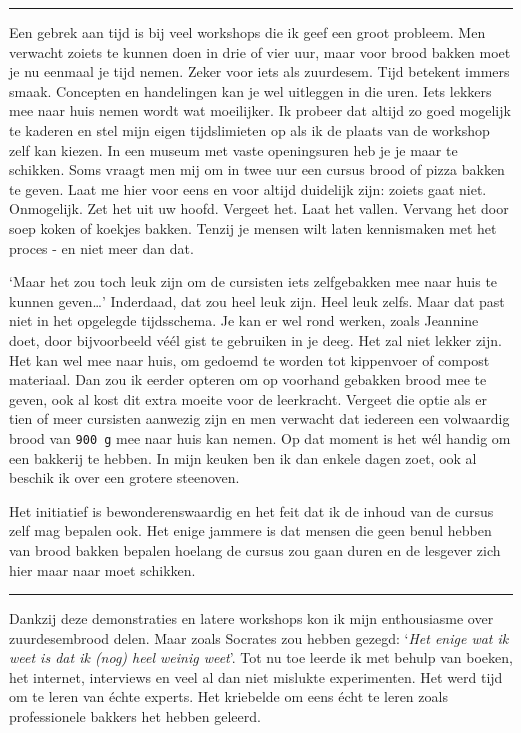 \documentclass[
  11pt,
  dutch,
]{memoir}
\begin{document}
\pfbreak

Een gebrek aan tijd is bij veel workshops die ik geef een groot
probleem. Men verwacht zoiets te kunnen doen in drie of vier uur, maar
voor brood bakken moet je nu eenmaal je tijd nemen. Zeker voor iets als
zuurdesem. Tijd betekent immers smaak. Concepten en handelingen kan je
wel uitleggen in die uren. Iets lekkers mee naar huis nemen wordt wat
moeilijker. Ik probeer dat altijd zo goed mogelijk te kaderen en stel
mijn eigen tijdslimieten op als ik de plaats van de workshop zelf kan
kiezen. In een museum met vaste openingsuren heb je je maar te schikken.
Soms vraagt men mij om in twee uur een cursus brood of pizza bakken te
geven. Laat me hier voor eens en voor altijd duidelijk zijn: zoiets gaat
niet. Onmogelijk. Zet het uit uw hoofd. Vergeet het. Laat het vallen.
Vervang het door soep koken of koekjes bakken. Tenzij je mensen wilt
laten kennismaken met het proces - en niet meer dan dat.

`Maar het zou toch leuk zijn om de cursisten iets zelfgebakken mee naar
huis te kunnen geven\ldots{}' Inderdaad, dat zou heel leuk zijn. Heel
leuk zelfs. Maar dat past niet in het opgelegde tijdsschema. Je kan er
wel rond werken, zoals Jeannine doet, door bijvoorbeeld véél gist te
gebruiken in je deeg. Het zal niet lekker zijn. Het kan wel mee naar
huis, om gedoemd te worden tot kippenvoer of compost materiaal. Dan zou
ik eerder opteren om op voorhand gebakken brood mee te geven, ook al
kost dit extra moeite voor de leerkracht. Vergeet die optie als er tien
of meer cursisten aanwezig zijn en men verwacht dat iedereen een
volwaardig brood van \texttt{900\ g} mee naar huis kan nemen. Op dat
moment is het wél handig om een bakkerij te hebben. In mijn keuken ben
ik dan enkele dagen zoet, ook al beschik ik over een grotere steenoven.

Het initiatief is bewonderenswaardig en het feit dat ik de inhoud van de
cursus zelf mag bepalen ook. Het enige jammere is dat mensen die geen
benul hebben van brood bakken bepalen hoelang de cursus zou gaan duren
en de lesgever zich hier maar naar moet schikken.

\pfbreak

Dankzij deze demonstraties en latere workshops kon ik mijn enthousiasme
over zuurdesembrood delen. Maar zoals Socrates zou hebben gezegd:
`\emph{Het enige wat ik weet is dat ik (nog) heel weinig weet}'. Tot nu
toe leerde ik met behulp van boeken, het internet, interviews en veel al
dan niet mislukte experimenten. Het werd tijd om te leren van échte
experts. Het kriebelde om eens écht te leren zoals professionele bakkers
het hebben geleerd.
\end{document}

